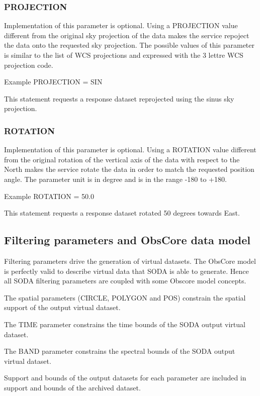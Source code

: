 \documentclass[11pt,a4paper]{ivoa}
\begin{document}
\subsubsection{PROJECTION}

Implementation of this parameter is optional. Using a PROJECTION value different from the original sky projection of the data makes the service repoject the data onto the requested sky projection. The possible values of this parameter is similar to the list of WCS projections and expressed with the 3 lettre WCS projection code.

Example PROJECTION = SIN

This statement requests a response dataset reprojected using the sinus sky projection.

\subsubsection{ROTATION}

Implementation of this parameter is optional. Using a ROTATION value different from the original rotation of the vertical axis of the data with respect to the North makes the service rotate the data in order to match  the requested position angle. The  parameter unit is in degree and is in the range -180 to +180.

Example ROTATION = 50.0

This statement requests a response dataset rotated 50 degrees towards East.





\subsection{Filtering parameters and ObsCore data model}


Filtering parameters drive the generation of virtual datasets.  The ObsCore model is perfectly valid to  describe virtual data that SODA is able to generate. Hence all SODA filtering parameters are coupled with some Obscore model concepts.

The spatial parameters (CIRCLE, POLYGON and POS) constrain the spatial support of the output virtual dataset. 


The TIME parameter constrains the time bounds of the SODA output virtual dataset. 

The BAND parameter constrains the spectral bounds of the SODA output virtual 
dataset. 

Support and bounds of the output datasets for each parameter are included in support and bounds of the archived dataset.
\end{document}
